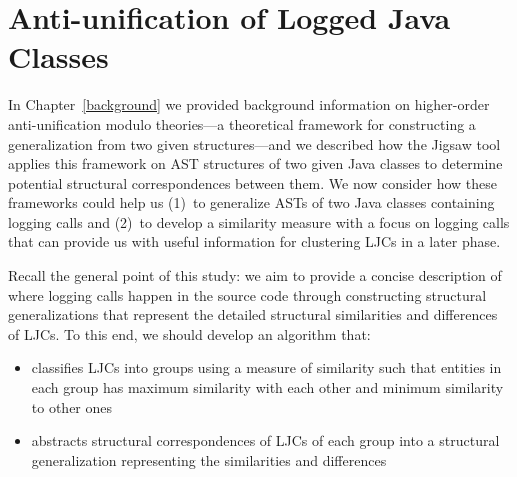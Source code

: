 
\chapter{Anti-unification of Logged Java Classes} \label{ch4} \label{methodology}
In Chapter~\ref{background} we provided background information on higher-order anti-unification modulo theories---a theoretical framework for constructing a generalization from two given structures---and we described how the Jigsaw tool applies this framework on AST structures of two given Java classes to determine potential structural correspondences between them. We now consider how these frameworks could help us (1)~to generalize ASTs of two Java classes containing logging calls and (2)~to develop a similarity measure with a focus on logging calls that can provide us with useful information for clustering LJCs in a later phase.

Recall the general point of this study: we aim to provide a concise description of where logging calls happen in the source code through constructing structural generalizations that represent the detailed structural similarities and differences of LJCs. To this end, we should develop an algorithm that:
\begin{itemize} [leftmargin=.3in]
\item classifies LJCs into groups using a measure of similarity such that entities in each group has maximum similarity with each other and minimum similarity to other ones
\item abstracts structural correspondences of LJCs of each group into a structural generalization representing the similarities and differences
\end{itemize}

